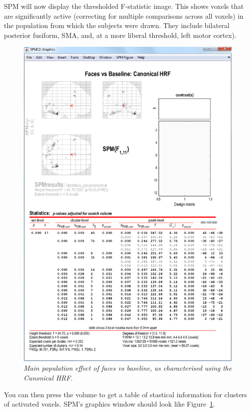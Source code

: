 SPM will now display the thresholded F-statistic image. This shows voxels that are significantly active (correcting for multiple comparisons across all voxels) in the population from which the subjects were drawn. They include bilateral posterior fusiform, SMA, and, at a more liberal threshold, left motor cortex). 
\begin{figure}
\begin{center}
\includegraphics[width=140mm]{faces_group/f1_res}
\caption{\em Main population effect of faces vs baseline, as characterised using the Canonical HRF. \label{f1_res}}
\end{center}
\end{figure}
You can then press the volume to get a table of stastical information for clusters of activated voxels. SPM's graphics window should look like Figure~\ref{f1_res}.


